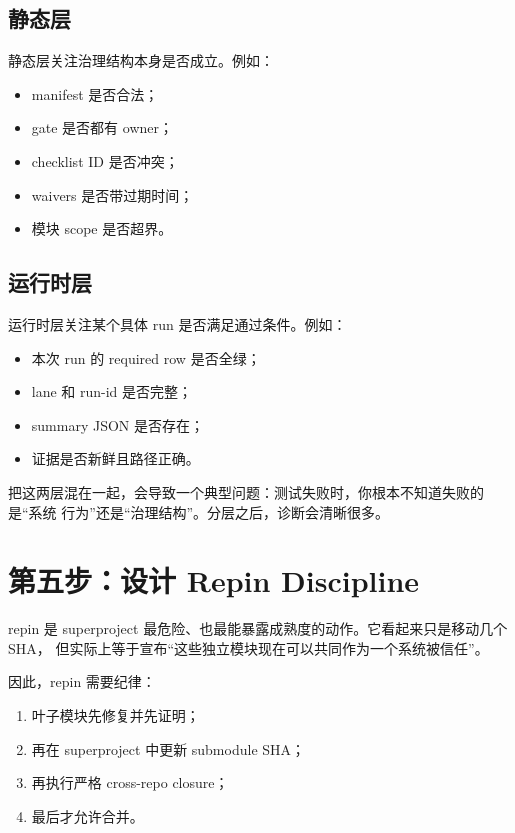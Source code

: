 \documentclass[UTF8,11pt,a4paper,oneside]{ctexbook}
\begin{document}
\subsection{静态层}

静态层关注治理结构本身是否成立。例如：

\begin{itemize}
  \item manifest 是否合法；
  \item gate 是否都有 owner；
  \item checklist ID 是否冲突；
  \item waivers 是否带过期时间；
  \item 模块 scope 是否超界。
\end{itemize}

\subsection{运行时层}

运行时层关注某个具体 run 是否满足通过条件。例如：

\begin{itemize}
  \item 本次 run 的 required row 是否全绿；
  \item lane 和 run-id 是否完整；
  \item summary JSON 是否存在；
  \item 证据是否新鲜且路径正确。
\end{itemize}

把这两层混在一起，会导致一个典型问题：测试失败时，你根本不知道失败的是“系统
行为”还是“治理结构”。分层之后，诊断会清晰很多。

\section{第五步：设计 Repin Discipline}

repin 是 superproject 最危险、也最能暴露成熟度的动作。它看起来只是移动几个 SHA，
但实际上等于宣布“这些独立模块现在可以共同作为一个系统被信任”。

因此，repin 需要纪律：

\begin{enumerate}
  \item 叶子模块先修复并先证明；
  \item 再在 superproject 中更新 submodule SHA；
  \item 再执行严格 cross-repo closure；
  \item 最后才允许合并。
\end{enumerate}
\end{document}
